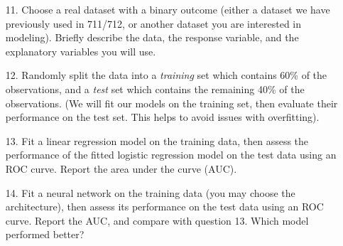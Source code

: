 \documentclass[11pt]{article}
\begin{document}
\begin{enumerate}
\item[11.] Choose a real dataset with a binary outcome (either a dataset we have previously used in 711/712, or another dataset you are interested in modeling). Briefly describe the data, the response variable, and the explanatory variables you will use.

\item[12.] Randomly split the data into a \textit{training} set which contains 60\% of the observations, and a \textit{test} set which contains the remaining 40\% of the observations. (We will fit our models on the training set, then evaluate their performance on the test set. This helps to avoid issues with overfitting).

\item[13.] Fit a linear regression model on the training data, then assess the performance of the fitted logistic regression model on the test data using an ROC curve. Report the area under the curve (AUC).

\item[14.] Fit a neural network on the training data (you may choose the architecture), then assess its performance on the test data using an ROC curve. Report the AUC, and compare with question 13. Which model performed better?
\end{enumerate}
\end{document}
